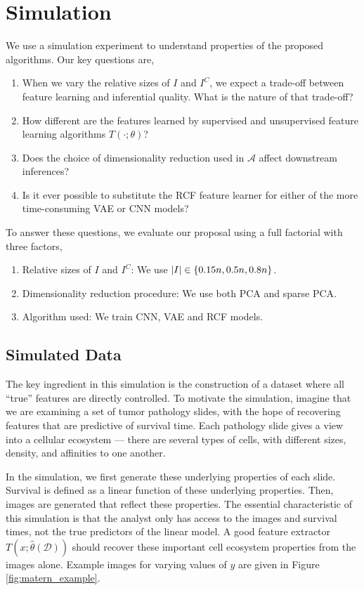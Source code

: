 
\section{Simulation}

We use a simulation experiment to understand properties of the proposed
algorithms. Our key questions are,

\begin{enumerate}
\item When we vary the relative sizes of $I$ and $I^{C}$, we expect a trade-off
  between feature learning and inferential quality. What is the nature of that
  trade-off?
\item How different are the features learned by supervised and unsupervised
  feature learning algorithms $T\left(\cdot; \theta\right)$?
\item Does the choice of dimensionality reduction used in $\mathcal{A}$ affect
  downstream inferences?
\item Is it ever possible to substitute the RCF feature learner for either of
  the more time-consuming VAE or CNN models?
\end{enumerate}

To answer these questions, we evaluate our proposal using a full factorial with
three factors,

\begin{enumerate}
\item Relative sizes of $I$ and $I^{C}$: We use $\left|I\right| \in \left\{0.15n, 0.5n, 0.8n\right\}$.
\item Dimensionality reduction procedure: We use both PCA and sparse PCA.
\item Algorithm used: We train CNN, VAE and RCF models.
\end{enumerate}

\subsection{Simulated Data}

The key ingredient in this simulation is the construction of a dataset where all
``true'' features are directly controlled. To motivate the simulation, imagine
that we are examining a set of tumor pathology slides, with the hope of
recovering features that are predictive of survival time. Each pathology slide
gives a view into a cellular ecosystem — there are several types of cells, with
different sizes, density, and affinities to one another.

In the simulation, we first generate these underlying properties of each slide.
Survival is defined as a linear function of these underlying properties. Then,
images are generated that reflect these properties. The essential characteristic
of this simulation is that the analyst only has access to the images and
survival times, not the true predictors of the linear model. A good feature
extractor $T\left(x; \hat{\theta}\left(\mathcal{D}\right)\right)$ should recover
these important cell ecosystem properties from the images alone. Example images
for varying values of $y$ are given in Figure \ref{fig:matern_example}.

